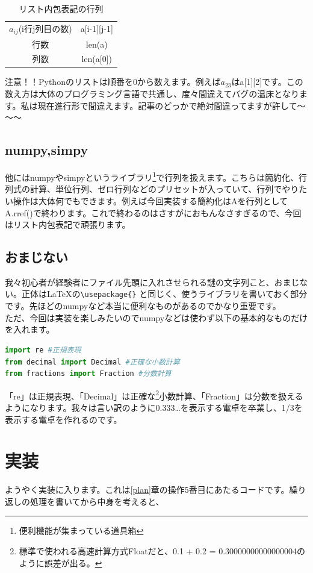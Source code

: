 \documentclass[lualatex,paper=a4paper]{jlreq}
\begin{document}
\begin{table}[htbp]
    \centering
    \caption{リスト内包表記の行列}
    \begin{tabular}{cc}
        \hline
        $a_{ij}$(i行j列目の数) & a[i-1][j-1] \\
        行数                & len(a)      \\
        列数                & len(a[0])   \\ \hline
    \end{tabular}
\end{table}
注意！！Pythonのリストは順番を0から数えます。例えば$a_{23}$はa[1][2]です。この数え方は大体のプログラミング言語で共通し、度々間違えてバグの温床となります。私は現在進行形で間違えます。記事のどっかで絶対間違ってますが許して～～～

\subsection{numpy,simpy}
他にはnumpyやsimpyというライブラリ\footnote{便利機能が集まっている道具箱}で行列を扱えます。こちらは簡約化、行列式の計算、単位行列、ゼロ行列などのプリセットが入っていて、行列でやりたい操作は大体何でもできます。例えば今回実装する簡約化はAを行列としてA.rref()で終わります。これで終わるのはさすがにおもんなさすぎるので、今回はリスト内包表記で頑張ります。
\newpage
\subsection{おまじない}
我々初心者が経験者にファイル先頭に入れさせられる謎の文字列こと、おまじない。正体は\LaTeX の\verb|\usepackage{}| と同じく、使うライブラリを書いておく部分です。先ほどのnumpyなど本当に便利なものがあるのでかなり重要です。\\
ただ、今回は実装を楽しみたいのでnumpyなどは使わず以下の基本的なものだけを入れます。
\begin{lstlisting}[language=Python,caption={便利なおまじない},label=code-sample]
import re #正規表現
from decimal import Decimal #正確な小数計算
from fractions import Fraction #分数計算
\end{lstlisting}
「re」は正規表現、「Decimal」は正確な\footnote{標準で使われる高速計算方式Floatだと、0.1 + 0.2 = 0.30000000000000004のように誤差が出る。}小数計算、「Fraction」は分数を扱えるようになります。我々は言い訳のように0.333\dots を表示する電卓を卒業し、1/3を表示する電卓を作れるのです。

\section{実装}
ようやく実装に入ります。これは\ref{plan}章の操作5番目にあたるコードです。繰り返しの処理を書いてから中身を考えると、
\end{document}
